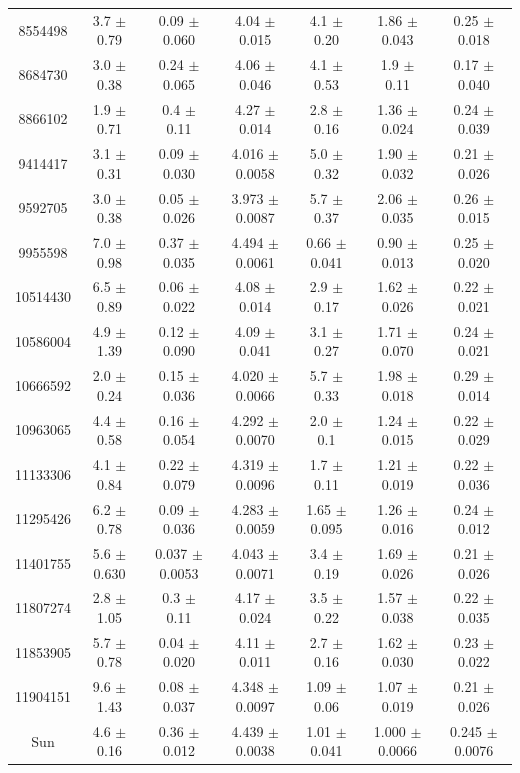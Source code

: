 {\begin{table}
\begin{tabular}{ccccccc}
 8554498 &  3.7 $\pm$ 0.79  & 0.09  $\pm$ 0.060  & 4.04  $\pm$ 0.015  & 4.1  $\pm$ 0.20  & 1.86  $\pm$ 0.043  & 0.25  $\pm$ 0.018 \\
 8684730 &  3.0 $\pm$ 0.38  & 0.24  $\pm$ 0.065  & 4.06  $\pm$ 0.046  & 4.1  $\pm$ 0.53  & 1.9   $\pm$ 0.11   & 0.17  $\pm$ 0.040 \\
 8866102 &  1.9 $\pm$ 0.71  & 0.4   $\pm$ 0.11   & 4.27  $\pm$ 0.014  & 2.8  $\pm$ 0.16  & 1.36  $\pm$ 0.024  & 0.24  $\pm$ 0.039 \\
 9414417 &  3.1 $\pm$ 0.31  & 0.09  $\pm$ 0.030  & 4.016 $\pm$ 0.0058 & 5.0  $\pm$ 0.32  & 1.90  $\pm$ 0.032  & 0.21  $\pm$ 0.026 \\
 9592705 &  3.0 $\pm$ 0.38  & 0.05  $\pm$ 0.026  & 3.973 $\pm$ 0.0087 & 5.7  $\pm$ 0.37  & 2.06  $\pm$ 0.035  & 0.26  $\pm$ 0.015 \\
 9955598 &  7.0 $\pm$ 0.98  & 0.37  $\pm$ 0.035  & 4.494 $\pm$ 0.0061 & 0.66 $\pm$ 0.041 & 0.90  $\pm$ 0.013  & 0.25  $\pm$ 0.020 \\
10514430 &  6.5 $\pm$ 0.89  & 0.06  $\pm$ 0.022  & 4.08  $\pm$ 0.014  & 2.9  $\pm$ 0.17  & 1.62  $\pm$ 0.026  & 0.22  $\pm$ 0.021 \\
10586004 &  4.9 $\pm$ 1.39  & 0.12  $\pm$ 0.090  & 4.09  $\pm$ 0.041  & 3.1  $\pm$ 0.27  & 1.71  $\pm$ 0.070  & 0.24  $\pm$ 0.021 \\
10666592 &  2.0 $\pm$ 0.24  & 0.15  $\pm$ 0.036  & 4.020 $\pm$ 0.0066 & 5.7  $\pm$ 0.33  & 1.98  $\pm$ 0.018  & 0.29  $\pm$ 0.014 \\
10963065 &  4.4 $\pm$ 0.58  & 0.16  $\pm$ 0.054  & 4.292 $\pm$ 0.0070 & 2.0  $\pm$ 0.1   & 1.24  $\pm$ 0.015  & 0.22  $\pm$ 0.029 \\
11133306 &  4.1 $\pm$ 0.84  & 0.22  $\pm$ 0.079  & 4.319 $\pm$ 0.0096 & 1.7  $\pm$ 0.11  & 1.21  $\pm$ 0.019  & 0.22  $\pm$ 0.036 \\
11295426 &  6.2 $\pm$ 0.78  & 0.09  $\pm$ 0.036  & 4.283 $\pm$ 0.0059 & 1.65 $\pm$ 0.095 & 1.26  $\pm$ 0.016  & 0.24  $\pm$ 0.012 \\
11401755 &  5.6 $\pm$ 0.630 & 0.037 $\pm$ 0.0053 & 4.043 $\pm$ 0.0071 & 3.4  $\pm$ 0.19  & 1.69  $\pm$ 0.026  & 0.21  $\pm$ 0.026 \\
11807274 &  2.8 $\pm$ 1.05  & 0.3   $\pm$ 0.11   & 4.17  $\pm$ 0.024  & 3.5  $\pm$ 0.22  & 1.57  $\pm$ 0.038  & 0.22  $\pm$ 0.035 \\
11853905 &  5.7 $\pm$ 0.78  & 0.04  $\pm$ 0.020  & 4.11  $\pm$ 0.011  & 2.7  $\pm$ 0.16  & 1.62  $\pm$ 0.030  & 0.23  $\pm$ 0.022 \\
11904151 &  9.6 $\pm$ 1.43  & 0.08  $\pm$ 0.037  & 4.348 $\pm$ 0.0097 & 1.09 $\pm$ 0.06  & 1.07  $\pm$ 0.019  & 0.21  $\pm$ 0.026 \\
Sun &  4.6 $\pm$ 0.16  & 0.36  $\pm$ 0.012  & 4.439 $\pm$ 0.0038 & 1.01 $\pm$ 0.041 & 1.000 $\pm$ 0.0066 & 0.245 $\pm$ 0.0076 \\ \hline \end{tabular}
\end{table}
}

